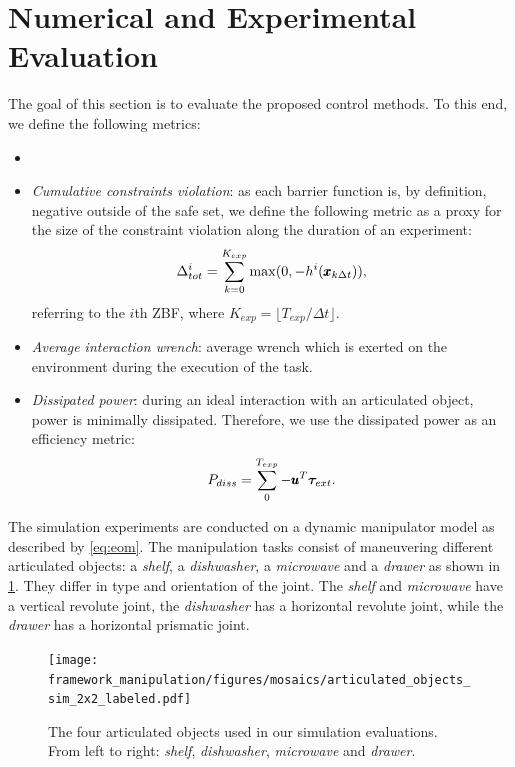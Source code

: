 \section{Numerical and Experimental Evaluation} \label{sec:experiments}

The goal of this section is to evaluate the proposed control methods. To this end, we define the following metrics:
\begin{itemize}
    \ifreview
    \item {}  
    \fi
    \item \textit{Cumulative constraints violation}: as each barrier function is, by definition, negative outside of the safe set, we define the following metric as a proxy for the size of the constraint violation along the duration of an experiment:
    \begin{equation*}
        \Delta^{i}_{tot} = \sum\limits_{k=0}^{K_{exp}} \max(0, -h^i(\pmb{x}_{k \Delta t})),
    \end{equation*}
    referring to the $i$th ZBF, where $K_{exp} = \lfloor T_{exp} / \Delta t \rfloor$.
    \item \textit{Average interaction wrench}: average wrench which is exerted on the environment during the execution of the task.
    \item \textit{Dissipated power}: during an ideal interaction with an articulated object, power is minimally dissipated. Therefore, we use the dissipated power as an efficiency metric:
    \begin{equation}
        P_{diss} = \sum\limits_{0}^{T_{exp}} -\pmb{u}^T \boldsymbol{\tau}_{ext}.
    \end{equation}
\end{itemize}
The simulation experiments are conducted on a dynamic manipulator model as described by \eqref{eq:eom}. The manipulation tasks consist of maneuvering different articulated objects: a \textit{shelf}, a \textit{dishwasher}, a \textit{microwave} and a \textit{drawer} as shown in \fig\ref{fig:object_manipulation}. They differ in type and orientation of the joint. The \textit{shelf} and \textit{microwave} have a vertical revolute joint, the \textit{dishwasher} has a horizontal revolute joint, while the \textit{drawer} has a horizontal prismatic joint.
  
\begin{figure}[t]
\centering
  \texttt{[image: framework\_manipulation/figures/mosaics/articulated\_objects\_sim\_2x2\_labeled.pdf]}
  \caption{The four articulated objects used in our simulation evaluations. From left to right: \textit{shelf}, \textit{dishwasher}, \textit{microwave} and \textit{drawer}. } \label{fig:object_manipulation}
\end{figure}


